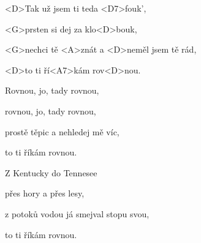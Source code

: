 

\zs
<D>Tak už jsem ti teda <D7>fouk',

<G>prsten si dej za klo<D>bouk,

<G>nechci tě <A>znát a <D>neměl jsem tě rád,

<D>to ti ří<A7>kám rov<D>nou.
\ks

\zr
Rovnou, jo, tady rovnou,

rovnou, jo, tady rovnou,

prostě těpic a nehledej mě víc,

to ti říkám rovnou.
\kr

\zs
Z Kentucky do Tennesee

přes hory a přes lesy,

z potoků vodou já smejval stopu svou,

to ti říkám rovnou.
\ks

\zr
\kr

\kp
